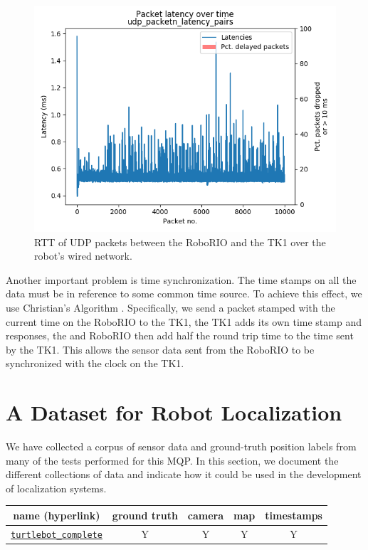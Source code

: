 \documentclass{article}
\begin{document}
		\begin{figure}[H]
			\centering
			\includegraphics[width=0.7\linewidth]{./images/rio_tk1_udp_latency_timeseries.png}
			\caption{RTT of UDP packets between the RoboRIO and the TK1 over the robot's wired network.}
			\label{fig:udp_timing}
		\end{figure}

		Another important problem is time synchronization. The time stamps on all the data must be in reference to some common time source. To achieve this effect, we use Christian's Algorithm \cite{cristian_probabilistic_1989}. Specifically, we send a packet stamped with the current time on the RoboRIO to the TK1, the TK1 adds its own time stamp and responses, the and RoboRIO then add half the round trip time to the time sent by the TK1. This allows the sensor data sent from the RoboRIO to be synchronized with the clock on the TK1.




\section{A Dataset for Robot Localization} \label{section:dataset}

  We have collected a corpus of sensor data and ground-truth position labels from many of the tests performed for this MQP. In this section, we document the different collections of data and indicate how it could be used in the development of localization systems.

  \begin{table}[H]
    \centering
    \begin{tabular}{|c|c|c|c|c|} \hline
      name (hyperlink) & ground truth & camera & map & timestamps \\ \hline
      \href{https://users.wpi.edu/~pdmitrano/phil-datasets/turtlebot_mocap_complete.tar.gz}{\texttt{turtlebot\_complete}} & Y & Y & Y & Y \\ \hline
    \end{tabular}
    \label{table:datasets}
  \end{table}
\end{document}

